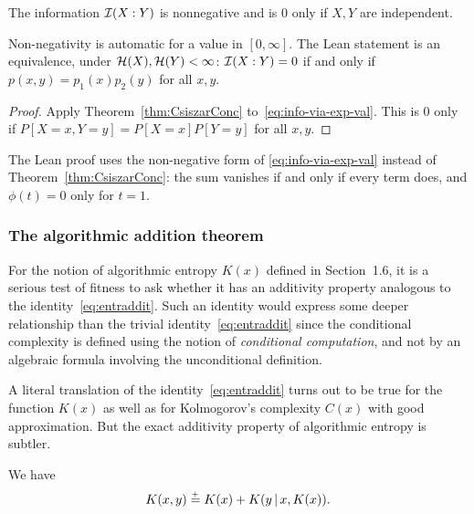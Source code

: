 \begin{proposition}
  \label{prop:g3.1.4}
  \leanok
  The information \( \mathcal{I}(X:Y) \) is nonnegative and is 0 only if \( X,Y \) are independent.
\end{proposition}

\begin{formalization}
Non-negativity is automatic for a value in \( [0, \infty] \). The Lean statement is an
equivalence, under \( \mathcal{H}(X), \mathcal{H}(Y) < \infty \): \( \mathcal{I}(X : Y) = 0 \) if and only if
\( p(x,y) = p_{1}(x) p_{2}(y) \) for all \( x, y \).
\end{formalization}

\begin{proof}
  \leanok
Apply Theorem~\ref{thm:CsiszarConc} to~\eqref{eq:info-via-exp-val}.
This is 0 only if \( P[X=x,Y=y]=P[X=x]P[Y=y] \) for all \( x,y \).
\end{proof}

\begin{formalization}
The Lean proof uses the non-negative form of \eqref{eq:info-via-exp-val} instead of
Theorem~\ref{thm:CsiszarConc}: the sum vanishes if and only if every term does, and
\( \phi(t) = 0 \) only for \( t = 1 \).
\end{formalization}


\subsubsection{The algorithmic addition theorem}
For the notion of algorithmic entropy \( K(x) \) defined in
Section~1.6, it is a serious test of fitness to ask whether it
has an additivity property analogous to the identity~\eqref{eq:entraddit}. 
Such an identity would express some deeper
relationship than the trivial identity~\eqref{eq:entraddit} since the
conditional complexity is defined using the notion of 
\emph{conditional computation}, and not by an algebraic formula involving
the unconditional definition.

A literal translation of the identity~\eqref{eq:entraddit} turns out to
be true for the function \( K(x) \) as well as for Kolmogorov's
complexity \( C(x) \) with good approximation. 
But the exact additivity property of algorithmic entropy is subtler. 

\begin{theorem}[Addition]
  \label{thm:g3.1.4}
  \leanok
We have
 \begin{equation}\label{eq:Haddit}
	K(x, y) \stackrel{{}_+}{=} K(x) + K(y \,\vert\, x, K(x)).
 \end{equation}
 \end{theorem}

